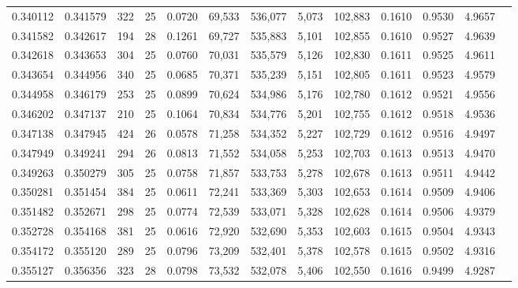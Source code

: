 \begin{tabular}{rrrrrrrrrrrrr}
0.340112 & 0.341579 &   322 &  25 &                                     0.0720 &  69,533 & 536,077 &   5,073 & 102,883 & 0.1610 & 0.9530 & 4.9657 \\
0.341582 & 0.342617 &   194 &  28 &                                     0.1261 &  69,727 & 535,883 &   5,101 & 102,855 & 0.1610 & 0.9527 & 4.9639 \\
0.342618 & 0.343653 &   304 &  25 &                                     0.0760 &  70,031 & 535,579 &   5,126 & 102,830 & 0.1611 & 0.9525 & 4.9611 \\
0.343654 & 0.344956 &   340 &  25 &                                     0.0685 &  70,371 & 535,239 &   5,151 & 102,805 & 0.1611 & 0.9523 & 4.9579 \\
0.344958 & 0.346179 &   253 &  25 &                                     0.0899 &  70,624 & 534,986 &   5,176 & 102,780 & 0.1612 & 0.9521 & 4.9556 \\
0.346202 & 0.347137 &   210 &  25 &                                     0.1064 &  70,834 & 534,776 &   5,201 & 102,755 & 0.1612 & 0.9518 & 4.9536 \\
0.347138 & 0.347945 &   424 &  26 &                                     0.0578 &  71,258 & 534,352 &   5,227 & 102,729 & 0.1612 & 0.9516 & 4.9497 \\
0.347949 & 0.349241 &   294 &  26 &                                     0.0813 &  71,552 & 534,058 &   5,253 & 102,703 & 0.1613 & 0.9513 & 4.9470 \\
0.349263 & 0.350279 &   305 &  25 &                                     0.0758 &  71,857 & 533,753 &   5,278 & 102,678 & 0.1613 & 0.9511 & 4.9442 \\
0.350281 & 0.351454 &   384 &  25 &                                     0.0611 &  72,241 & 533,369 &   5,303 & 102,653 & 0.1614 & 0.9509 & 4.9406 \\
0.351482 & 0.352671 &   298 &  25 &                                     0.0774 &  72,539 & 533,071 &   5,328 & 102,628 & 0.1614 & 0.9506 & 4.9379 \\
0.352728 & 0.354168 &   381 &  25 &                                     0.0616 &  72,920 & 532,690 &   5,353 & 102,603 & 0.1615 & 0.9504 & 4.9343 \\
0.354172 & 0.355120 &   289 &  25 &                                     0.0796 &  73,209 & 532,401 &   5,378 & 102,578 & 0.1615 & 0.9502 & 4.9316 \\
0.355127 & 0.356356 &   323 &  28 &                                     0.0798 &  73,532 & 532,078 &   5,406 & 102,550 & 0.1616 & 0.9499 & 4.9287 \\

\end{tabular}
